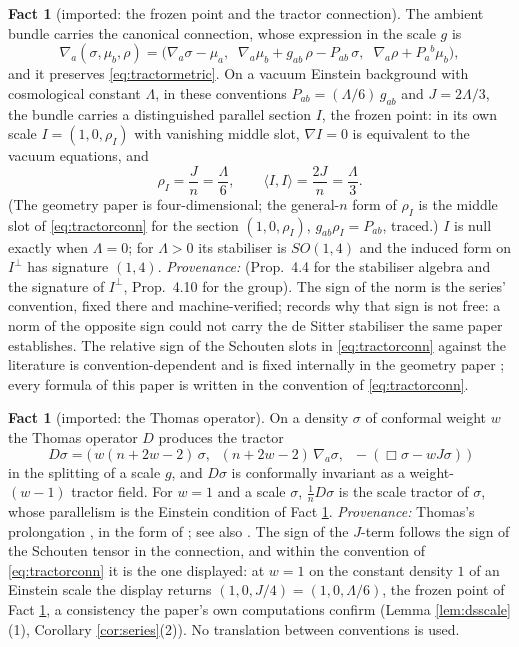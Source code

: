 \documentclass[11pt]{article}
\theoremstyle{definition}
\newtheorem{fact}[theorem]{Fact}
\newcommand{\ip}[2]{\langle #1, #2\rangle}
\begin{document}
\begin{fact}[imported: the frozen point and the tractor connection]\label{fact:frozen}
The ambient bundle carries the canonical connection, whose expression in the scale $g$ is
\begin{equation}\label{eq:tractorconn}
\nabla_{a}(\sigma, \mu_{b}, \rho) = \bigl(\nabla_{a}\sigma - \mu_{a},\;\; \nabla_{a}\mu_{b} + g_{ab}\,\rho - P_{ab}\,\sigma,\;\; \nabla_{a}\rho + P_{a}{}^{b}\mu_{b}\bigr),
\end{equation}
and it preserves \eqref{eq:tractormetric}. On a vacuum Einstein background with cosmological constant $\Lambda$, in these conventions $P_{ab} = (\Lambda/6)\,g_{ab}$ and $J = 2\Lambda/3$, the bundle carries a distinguished parallel section $I$, the frozen point: in its own scale $I = (1, 0, \rho_{I})$ with vanishing middle slot, $\nabla I = 0$ is equivalent to the vacuum equations, and
\[
\rho_{I} = \frac{J}{n} = \frac{\Lambda}{6}, \qquad \ip{I}{I} = \frac{2J}{n} = \frac{\Lambda}{3}.
\]
(The geometry paper is four-dimensional; the general-$n$ form of $\rho_{I}$ is the middle slot of \eqref{eq:tractorconn} for the section $(1, 0, \rho_{I})$, $g_{ab}\rho_{I} = P_{ab}$, traced.) $I$ is null exactly when $\Lambda = 0$; for $\Lambda > 0$ its stabiliser is $SO(1,4)$ and the induced form on $I^{\perp}$ has signature $(1,4)$. \emph{Provenance:} \cite[Fact~4.1, Prop.~4.4, Thm.~4.5, Thm.~4.7, Prop.~4.10]{ButlerT6} (Prop.~4.4 for the stabiliser algebra and the signature of $I^{\perp}$, Prop.~4.10 for the group). The sign of the norm is the series' convention, fixed there and machine-verified; \cite[Rem.~4.9]{ButlerT6} records why that sign is not free: a norm of the opposite sign could not carry the de Sitter stabiliser the same paper establishes. The relative sign of the Schouten slots in \eqref{eq:tractorconn} against the literature is convention-dependent and is fixed internally in the geometry paper \cite[Lem.~4.8]{ButlerT6}; every formula of this paper is written in the convention of \eqref{eq:tractorconn}.
\end{fact}

\begin{fact}[imported: the Thomas operator]\label{fact:thomas}
On a density $\sigma$ of conformal weight $w$ the Thomas operator $D$ produces the tractor
\[
D\sigma = \bigl(\, w(n+2w-2)\,\sigma,\;\; (n+2w-2)\,\nabla_{a}\sigma,\;\; -(\Box\sigma - wJ\sigma)\,\bigr)
\]
in the splitting of a scale $g$, and $D\sigma$ is conformally invariant as a weight-$(w-1)$ tractor field. For $w = 1$ and a scale $\sigma$, $\tfrac1n D\sigma$ is the scale tractor of $\sigma$, whose parallelism is the Einstein condition of Fact \ref{fact:frozen}. \emph{Provenance:} Thomas's prolongation \cite{Thomas1926}, in the form of \cite{BEG1994}; see also \cite{Gover2010}. The sign of the $J$-term follows the sign of the Schouten tensor in the connection, and within the convention of \eqref{eq:tractorconn} it is the one displayed: at $w = 1$ on the constant density $1$ of an Einstein scale the display returns $(1, 0, J/4) = (1, 0, \Lambda/6)$, the frozen point of Fact \ref{fact:frozen}, a consistency the paper's own computations confirm (Lemma \ref{lem:dsscale}(1), Corollary \ref{cor:series}(2)). No translation between conventions is used.
\end{fact}
\end{document}
